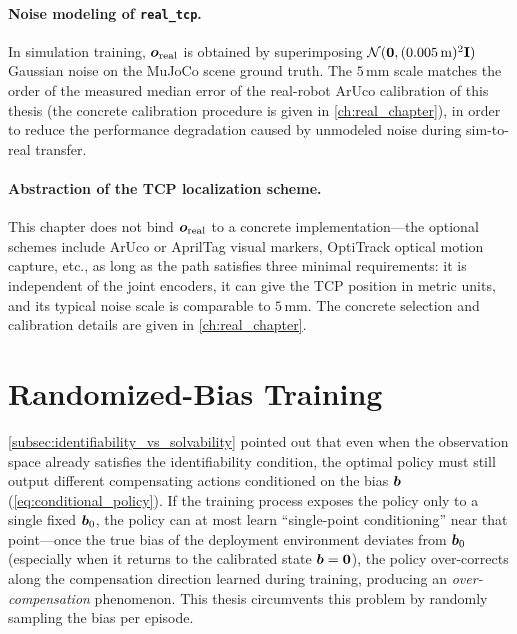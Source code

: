 \paragraph{Noise modeling of \texttt{real\_tcp}.} In simulation training, $\bm{o}_\text{real}$ is obtained by superimposing $\mathcal{N}(\bm{0}, (0.005\,\text{m})^2\mathbf{I})$ Gaussian noise on the MuJoCo scene ground truth. The $5\,\text{mm}$ scale matches the order of the measured median error of the real-robot ArUco calibration of this thesis (the concrete calibration procedure is given in \cref{ch:real_chapter}), in order to reduce the performance degradation caused by unmodeled noise during sim-to-real transfer.

\paragraph{Abstraction of the TCP localization scheme.} This chapter does not bind $\bm{o}_\text{real}$ to a concrete implementation---the optional schemes include ArUco or AprilTag visual markers, OptiTrack optical motion capture, etc., as long as the path satisfies three minimal requirements: it is independent of the joint encoders, it can give the TCP position in metric units, and its typical noise scale is comparable to $5$\,mm. The concrete selection and calibration details are given in \cref{ch:real_chapter}.

\section{Randomized-Bias Training}\label{sec:random_bias}

\cref{subsec:identifiability_vs_solvability} pointed out that even when the observation space already satisfies the identifiability condition, the optimal policy must still output different compensating actions conditioned on the bias $\bm{b}$ (\cref{eq:conditional_policy}). If the training process exposes the policy only to a single fixed $\bm{b}_0$, the policy can at most learn ``single-point conditioning'' near that point---once the true bias of the deployment environment deviates from $\bm{b}_0$ (especially when it returns to the calibrated state $\bm{b}=\bm{0}$), the policy over-corrects along the compensation direction learned during training, producing an \emph{over-compensation} phenomenon. This thesis circumvents this problem by randomly sampling the bias per episode.

